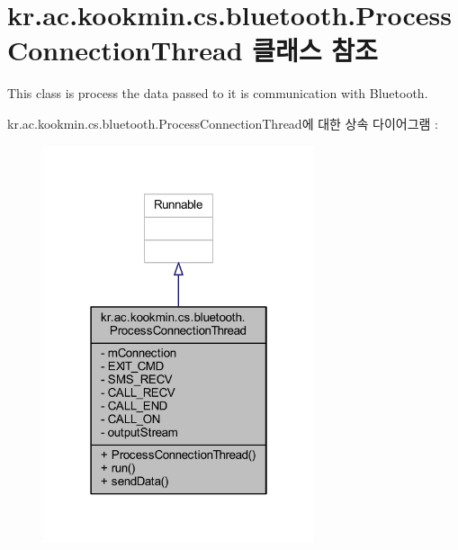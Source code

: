 \hypertarget{classkr_1_1ac_1_1kookmin_1_1cs_1_1bluetooth_1_1_process_connection_thread}{}\section{kr.\+ac.\+kookmin.\+cs.\+bluetooth.\+Process\+Connection\+Thread 클래스 참조}
\label{classkr_1_1ac_1_1kookmin_1_1cs_1_1bluetooth_1_1_process_connection_thread}


This class is process the data passed to it is communication with Bluetooth.  




kr.\+ac.\+kookmin.\+cs.\+bluetooth.\+Process\+Connection\+Thread에 대한 상속 다이어그램 \+: \nopagebreak
\begin{figure}[H]
\begin{center}
\leavevmode
\includegraphics[width=226pt]{classkr_1_1ac_1_1kookmin_1_1cs_1_1bluetooth_1_1_process_connection_thread__inherit__graph}
\end{center}
\end{figure}


